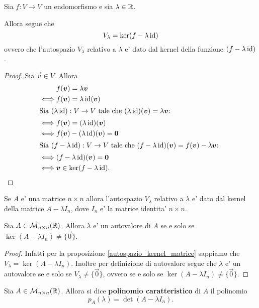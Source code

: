 \begin{proposition}
    Sia $f : V \to V$ un endomorfismo e sia $\lambda \in \mathbb{R}$. 
    
    Allora segue che \[
        V_{\lambda} = \ker (f - \lambda\operatorname{id})    
    \] ovvero che l'autospazio $V_{\lambda}$ relativo a $\lambda$ e' dato dal kernel della funzione $(f - \lambda\operatorname{id})$.
\end{proposition}
\begin{proof}
    Sia $\vec v \in V$. Allora \begin{alignat*}
        {1}
        &f(\bm{v}) = \lambda\bm{v} \\
        \iff &f(\bm{v}) = \lambda\operatorname{id}(\bm{v})\\
        \intertext{Sia $(\lambda\operatorname{id}) : V \to V$ tale che $(\lambda\operatorname{id})(\bm{v}) = \lambda \bm{v}$: }
        \iff &f(\bm{v}) = (\lambda\operatorname{id})(\bm{v})\\
        \iff &f(\bm{v}) - (\lambda\operatorname{id})(\bm{v}) = \bm{0}\\
        \intertext{Sia $(f - \lambda\operatorname{id}) : V \to V$ tale che $(f - \lambda\operatorname{id})(\bm{v}) = f(\bm{v}) - \lambda \bm{v}$: }
        \iff &(f - \lambda\operatorname{id})(\bm{v}) = \bm{0}\\
        \iff &\bm{v} \in \ker (f - \lambda\operatorname{id}). \tag*{\qedhere}
    \end{alignat*}
\end{proof}

\begin{corollary}\label{autospazio_kernel_matrice}
    Se $A$ e' una matrice $n \times n$ allora l'autospazio $V_{\lambda}$ relativo a $\lambda$ e' dato dal kernel della matrice $A - \lambda I_n$, dove $I_n$ e' la matrice identita' $n \times n$.
\end{corollary}

\begin{proposition}\label{autovalore_sse_kernel_nonnullo}
    Sia $A \in \mathcal{M}_{n \times n}(\mathbb{R})$. Allora $\lambda$ e' un autovalore di $A$ se e solo se $\ker (A - \lambda I_n) \neq \{\vec 0\}$. 
\end{proposition}
\begin{proof}
    Infatti per la proposizione \ref{autospazio_kernel_matrice} sappiamo che $V_{\lambda} = \ker (A - \lambda I_n)$. Inoltre per definizione di autovalore segue che $\lambda$ e' un autovalore se e solo se $V_{\lambda} \neq \{\vec 0\}$, ovvero se e solo se $\ker (A - \lambda I_n) \neq \{\vec 0\}$.
\end{proof}

\begin{definition}
    Sia $A \in \mathcal{M}_{n \times n}(\mathbb{R})$. Allora si dice \textbf{polinomio caratteristico} di $A$ il polinomio \[
        p_A(\lambda) = \det (A - \lambda I_n). 
    \]
\end{definition}

